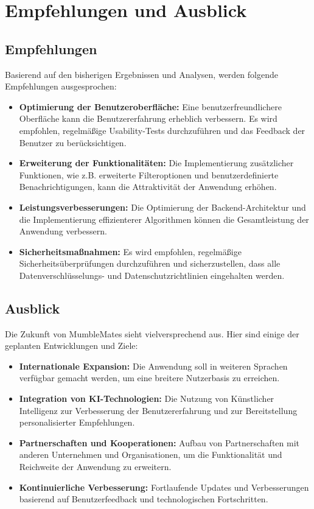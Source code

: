 \section{Empfehlungen und Ausblick}

\subsection{Empfehlungen}

Basierend auf den bisherigen Ergebnissen und Analysen, werden folgende Empfehlungen ausgesprochen:

\begin{itemize}
    \item \textbf{Optimierung der Benutzeroberfläche:} Eine benutzerfreundlichere Oberfläche kann die Benutzererfahrung erheblich verbessern. Es wird empfohlen, regelmäßige Usability-Tests durchzuführen und das Feedback der Benutzer zu berücksichtigen.
    \item \textbf{Erweiterung der Funktionalitäten:} Die Implementierung zusätzlicher Funktionen, wie z.B. erweiterte Filteroptionen und benutzerdefinierte Benachrichtigungen, kann die Attraktivität der Anwendung erhöhen.
    \item \textbf{Leistungsverbesserungen:} Die Optimierung der Backend-Architektur und die Implementierung effizienterer Algorithmen können die Gesamtleistung der Anwendung verbessern.
    \item \textbf{Sicherheitsmaßnahmen:} Es wird empfohlen, regelmäßige Sicherheitsüberprüfungen durchzuführen und sicherzustellen, dass alle Datenverschlüsselungs- und Datenschutzrichtlinien eingehalten werden.
\end{itemize}

\subsection{Ausblick}

Die Zukunft von MumbleMates sieht vielversprechend aus. Hier sind einige der geplanten Entwicklungen und Ziele:

\begin{itemize}
    \item \textbf{Internationale Expansion:} Die Anwendung soll in weiteren Sprachen verfügbar gemacht werden, um eine breitere Nutzerbasis zu erreichen.
    \item \textbf{Integration von KI-Technologien:} Die Nutzung von Künstlicher Intelligenz zur Verbesserung der Benutzererfahrung und zur Bereitstellung personalisierter Empfehlungen.
    \item \textbf{Partnerschaften und Kooperationen:} Aufbau von Partnerschaften mit anderen Unternehmen und Organisationen, um die Funktionalität und Reichweite der Anwendung zu erweitern.
    \item \textbf{Kontinuierliche Verbesserung:} Fortlaufende Updates und Verbesserungen basierend auf Benutzerfeedback und technologischen Fortschritten.
\end{itemize}

